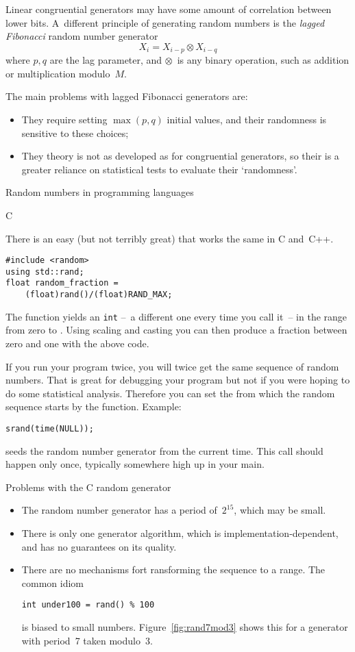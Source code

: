 Linear congruential generators may have some amount of correlation
between lower bits. A~different principle of generating random numbers
is the
\emph{lagged Fibonacci}
random number generator
\[ X_i = X_{i-p}\otimes X_{i-q} \]
where $p,q$ are the lag parameter, and $\otimes$~is any binary operation,
such as addition or multiplication modulo~$M$.

The main problems with lagged Fibonacci generators are:
\begin{itemize}
\item They require setting $\max(p,q)$ initial values, and their
  randomness is sensitive to these choices;
\item They theory is not as developed as for congruential generators,
  so their is a greater reliance on statistical tests to evaluate
  their `randomness'.
\end{itemize}

 {Random numbers in programming languages}

 {C}
\lstset{language=C}

There is an easy (but not terribly great)
that works the same in C and~C++.
%
\begin{lstlisting}
#include <random>
using std::rand;
float random_fraction =
    (float)rand()/(float)RAND_MAX;
\end{lstlisting}
%
The function  yields an \lstinline{int}
--~a different one every time you call it~--
in the range from zero to .
Using scaling and casting you can then produce a fraction between zero
and one with the above code.

If you run your program twice, you will twice get the same sequence of
random numbers. That is great for debugging your program but not if
you were hoping to do some statistical analysis. Therefore you can set
the  from which the random sequence
starts by the  function. Example:
\begin{lstlisting}
srand(time(NULL));
\end{lstlisting}
seeds the random number generator from the current time.
This call should happen only once, typically somewhere high up in your main.

 {Problems with the C random generator}

\begin{itemize}
\item The random number generator has a period of~$2^{15}$, which may be small.
\item There is only one generator algorithm, which is implementation-dependent,
  and has no guarantees on its quality.
\item There are no mechanisms fort ransforming the sequence to a range.
  The common idiom
\begin{lstlisting}
int under100 = rand() % 100
\end{lstlisting}
is biased to small numbers. Figure~\ref{fig:rand7mod3} shows this
for a generator with period~7 taken modulo~3.
\end{itemize}

